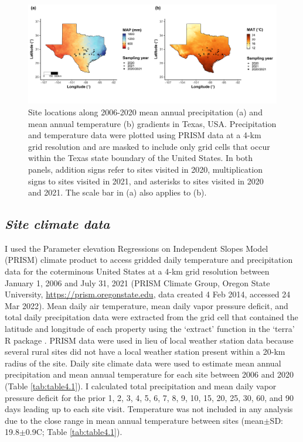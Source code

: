 \newpage
\begin{landscape}
    \begin{figure}
        \centering
        \includegraphics[scale = 0.049]{ch4_TXeco/figs/TXeco_fig1_site_map.png}
        \caption[Site locations along 2006-2020 mean annual precipitation and mean annual temperature gradients in Texas, USA.]{Site locations along 2006-2020 mean annual precipitation (a) and mean annual temperature (b) gradients in Texas, USA. Precipitation and temperature data were plotted using PRISM data at a 4-km grid resolution and are masked to include only grid cells that occur within the Texas state boundary of the United States. In both panels, addition signs refer to sites visited in 2020, multiplication signs to sites visited in 2021, and asterisks to sites visited in 2020 and 2021. The scale bar in (a) also applies to (b).}
        \label{fig:figure4.1}
    \end{figure}
\end{landscape}
\clearpage

\subsection{\textit{Site climate data}}
\noindent I used the Parameter elevation Regressions on Independent Slopes Model (PRISM)  climate product to access gridded daily temperature and precipitation data for the coterminous United States at a 4-km grid resolution between January 1, 2006 and July 31, 2021 (PRISM Climate Group, Oregon State University, \url{https://prism.oregonstate.edu}, data created 4 Feb 2014, accessed 24 Mar 2022). Mean daily air temperature, mean daily vapor pressure deficit, and total daily precipitation data were extracted from the grid cell that contained the latitude and longitude of each property using the `extract’ function in the `terra’ R package . PRISM data were used in lieu of local weather station data because several rural sites did not have a local weather station present within a 20-km radius of the site. Daily site climate data were used to estimate mean annual precipitation and mean annual temperature for each site between 2006 and 2020 (Table \ref{tab:table4.1}). I calculated total precipitation and mean daily vapor pressure deficit for the prior 1, 2, 3, 4, 5, 6, 7, 8, 9, 10, 15, 20, 25, 30, 60, and 90 days leading up to each site visit. Temperature was not included in any analysis due to the close range in mean annual temperature between sites (mean$\pm$SD: 19.8$\pm$0.9\textdegree{}C; Table \ref{tab:table4.1}).

